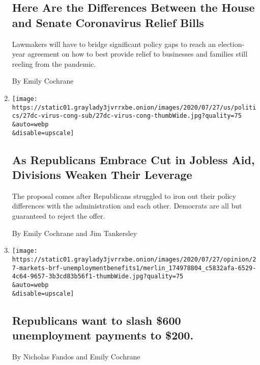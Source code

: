 \begin{enumerate}
{  \subsection{Here Are the Differences Between the House and Senate
  Coronavirus Relief
  Bills}\label{here-are-the-differences-between-the-house-and-senate-coronavirus-relief-bills}}

  Lawmakers will have to bridge significant policy gaps to reach an
  election-year agreement on how to best provide relief to businesses
  and families still reeling from the pandemic.

  By Emily Cochrane
\item
  \href{/2020/07/27/us/politics/republicans-jobless-aid.html}{}

  \texttt{[image: https://static01.graylady3jvrrxbe.onion/images/2020/07/27/us/politics/27dc-virus-cong-sub/27dc-virus-cong-thumbWide.jpg?quality=75\\\&auto=webp\\\&disable=upscale]}

  \hypertarget{as-republicans-embrace-cut-in-jobless-aid-divisions-weaken-their-leverage}{%
  \subsection{As Republicans Embrace Cut in Jobless Aid, Divisions
  Weaken Their
  Leverage}\label{as-republicans-embrace-cut-in-jobless-aid-divisions-weaken-their-leverage}}

  The proposal comes after Republicans struggled to iron out their
  policy differences with the administration and each other. Democrats
  are all but guaranteed to reject the offer.

  By Emily Cochrane and Jim Tankersley
\item
  \href{/live/2020/07/27/business/stock-market-today-coronavirus/republicans-want-to-slash-600-unemployment-payments-to-200}{}

  \texttt{[image: https://static01.graylady3jvrrxbe.onion/images/2020/07/27/opinion/27-markets-brf-unemploymentbenefits1/merlin\_174978804\_c5832afa-6529-4c64-9657-3b3cd83b56f1-thumbWide.jpg?quality=75\\\&auto=webp\\\&disable=upscale]}

  \hypertarget{republicans-want-to-slash-600-unemployment-payments-to-200}{%
  \subsection{Republicans want to slash \$600 unemployment payments to
  \$200.}\label{republicans-want-to-slash-600-unemployment-payments-to-200}}

  By Nicholas Fandos and Emily Cochrane
\end{enumerate}


